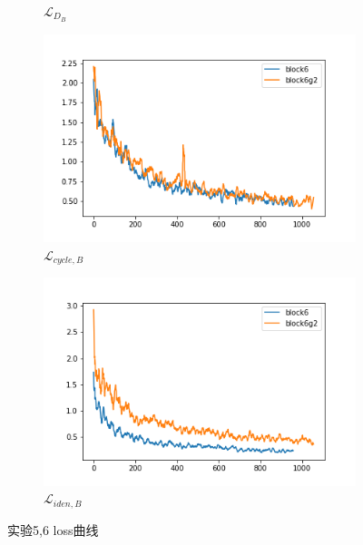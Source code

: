 \documentclass{beamer}
\begin{document}
\begin{frame}
\begin{figure}[htb]
\begin{subfigure}[b]{0.23\linewidth}
        \caption{$\mathcal{L}_{D_B}$}
      \end{subfigure}
      \begin{subfigure}[b]{0.23\linewidth}
        \includegraphics[width=\linewidth]{exp6_cycle_B.png}
        \caption{$\mathcal{L}_{cycle,B}$}
      \end{subfigure}
      \begin{subfigure}[b]{0.23\linewidth}
        \includegraphics[width=\linewidth]{exp6_idt_B.png}
        \caption{$\mathcal{L}_{iden,B}$}
      \end{subfigure}
      \caption{实验5,6 loss曲线}
      \label{fig:exp6loss}
\end{figure}   
\end{frame}
\end{document}

